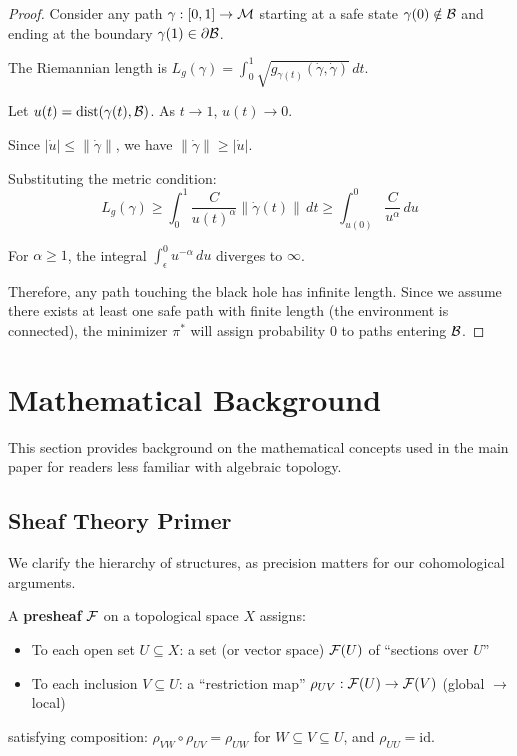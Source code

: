 \begin{proof}
Consider any path $\gamma: [0, 1] \to \mathcal{M}$ starting at a safe state $\gamma(0) \notin \mathcal{B}$ and ending at the boundary $\gamma(1) \in \partial \mathcal{B}$.

The Riemannian length is $L_g(\gamma) = \int_0^1 \sqrt{g_{\gamma(t)}(\dot{\gamma}, \dot{\gamma})} \, dt$.

Let $u(t) = \text{dist}(\gamma(t), \mathcal{B})$. As $t \to 1$, $u(t) \to 0$.

Since $|\dot{u}| \le \|\dot{\gamma}\|$, we have $\|\dot{\gamma}\| \ge |\dot{u}|$.

Substituting the metric condition:
\begin{equation}
L_g(\gamma) \ge \int_0^1 \frac{C}{u(t)^\alpha} \|\dot{\gamma}(t)\| \, dt \ge \int_{u(0)}^{0} \frac{C}{u^\alpha} \, du
\end{equation}

For $\alpha \ge 1$, the integral $\int_\epsilon^0 u^{-\alpha} \, du$ diverges to $\infty$.

Therefore, any path touching the black hole has infinite length. Since we assume there exists at least one safe path with finite length (the environment is connected), the minimizer $\pi^*$ will assign probability 0 to paths entering $\mathcal{B}$.
\end{proof}

\section{Mathematical Background}
\label{app:math_background}

This section provides background on the mathematical concepts used in the main paper for readers less familiar with algebraic topology.

\subsection{Sheaf Theory Primer}

We clarify the hierarchy of structures, as precision matters for our cohomological arguments.

A \textbf{presheaf} $\mathcal{F}$ on a topological space $X$ assigns:
\begin{itemize}
    \item To each open set $U \subseteq X$: a set (or vector space) $\mathcal{F}(U)$ of ``sections over $U$''
    \item To each inclusion $V \subseteq U$: a ``restriction map'' $\rho_{UV}: \mathcal{F}(U) \to \mathcal{F}(V)$ (global $\to$ local)
\end{itemize}
satisfying composition: $\rho_{VW} \circ \rho_{UV} = \rho_{UW}$ for $W \subseteq V \subseteq U$, and $\rho_{UU} = \text{id}$.

